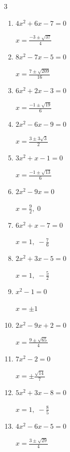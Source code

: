 \begin{multicols}{3}
\begin{enumerate}
  \item $4x^{2}+6x-7=0$

        $\displaystyle x=\frac{-3\pm \sqrt{37}}{4}$

  \item $8x^{2}-7x-5=0$

        $\displaystyle x=\frac{7\pm \sqrt{209}}{16}$

  \item $6x^{2}+2x-3=0$

        $\displaystyle x=\frac{-1\pm \sqrt{19}}{6}$

  \item $2x^{2}-6x-9=0$

        $\displaystyle x=\frac{3\pm 3\sqrt{3}}{2}$

  \item $3x^{2}+x-1=0$

        $\displaystyle x=\frac{-1\pm \sqrt{13}}{6}$

\columnbreak %

\resetques

  \item $2x^{2}-9x=0$

        $\displaystyle x=\frac{9}{2}, \; 0$

  \item $6x^{2}+x-7=0$

        $\displaystyle x=1, \; -\frac{7}{6}$

  \item $2x^{2}+3x-5=0$

        $\displaystyle x=1, \; -\frac{5}{2}$

  \item $x^{2}-1=0$

        $\displaystyle x=\pm 1$

  \item $2x^{2}-9x+2=0$

        $\displaystyle x=\frac{9\pm \sqrt{65}}{4}$

  \item $7x^{2}-2=0$

        $\displaystyle x=\pm \frac{\sqrt{14}}{7}$

  \item $5x^{2}+3x-8=0$

        $\displaystyle x=1, \; -\frac{8}{5}$

\columnbreak %

  \item $4x^{2}-6x-5=0$

        $\displaystyle x=\frac{3\pm \sqrt{29}}{4}$


\end{enumerate}
\end{multicols}
